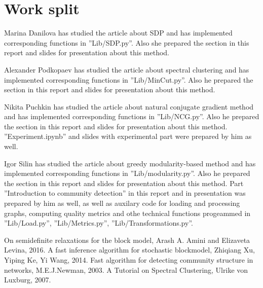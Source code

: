 \documentclass[11pt,a4paper]{extarticle}
\begin{document}
\section{Work split}

Marina Danilova has studied the article about SDP and has implemented corresponding functions in ''Lib/SDP.py''. 
Also she prepared the section in this report and slides for presentation about this method.

Alexander Podkopaev has studied the article about spectral clustering and has implemented corresponding functions in ''Lib/MinCut.py''.
Also he prepared the section in this report and slides for presentation about this method.

Nikita Puchkin has studied the article about natural conjugate gradient method and has implemented corresponding functions in ''Lib/NCG.py''.
Also he prepared the section in this report and slides for presentation about this method. ''Experiment.ipynb'' and slides with experimental part were prepared by him as well.

Igor Silin has studied the article about greedy modularity-based method and has implemented corresponding functions in ''Lib/modularity.py''.
Also he prepared the section in this report and slides for presentation about this method. Part ''Introduction to community detection'' in this report and in presentation  was prepared by him as well, as well as auxilary code for loading and processing graphs, computing quality metrics and othe technical functions progeammed in ''Lib/Load.py'', ''Lib/Metrics.py'', ''Lib/Transformations.py''.




\renewcommand{\refname}{References}
\begin{thebibliography}{9}
	On semidefinite relaxations for the block model, Arash A. Amini and Elizaveta Levina, 2016.
    A fast inference algorithm for stochastic blockmodel, Zhiqiang Xu, Yiping Ke, Yi Wang, 2014.
    Fast algorithm for detecting community structure in networks, M.E.J.Newman, 2003.
    A Tutorial on Spectral Clustering, Ulrike von Luxburg, 2007.
\end{thebibliography}
\end{document}
